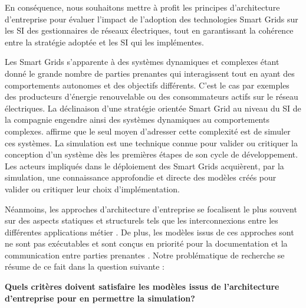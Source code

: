 En conséquence, nous souhaitons mettre à profit les principes d'architecture d'entreprise pour 
évaluer l'impact de l'adoption des technologies Smart Grids sur les SI des 
gestionnaires de réseaux électriques, tout en garantissant la cohérence entre la 
stratégie adoptée et les SI qui les implémentes. 




Les Smart Grids s'apparente à des systèmes  dynamiques et complexes 
\cite{monti_power_2010} étant donné le grande nombre de parties prenantes qui interagissent  tout en ayant des comportements autonomes et des objectifs différents. C'est le cas par exemples des producteurs d'énergie renouvelable ou des consommateurs actifs sur le réseau électriques. La déclinaison d'une stratégie orientée Smart Grid au niveau du 
SI de la compagnie engendre ainsi des systèmes dynamiques au comportements 
complexes. \cite{borshchev2004system} affirme que le seul moyen d'adresser cette 
complexité est de simuler ces systèmes. La simulation est une technique connue 
pour valider ou critiquer la conception d'un système dès les premières étapes de 
son cycle de développement. Les acteurs impliqués dans le déploiement des 
Smart Grids acquièrent, par la  simulation, une connaissance approfondie et 
directe des modèles créés pour valider ou critiquer leur choix d'implémentation.

Néanmoins, les approches d'architecture d'entreprise se focalisent le plus souvent sur 
des aspects statiques et structurels tels que les interconnexions entre les 
différentes applications métier \cite{buckl2008towards}. De plus, les modèles 
issus de ces approches sont ne sont pas exécutables et sont conçus en priorité pour la documentation et la communication entre parties prenantes \cite{kulkarni2013modelling}. Notre 
problématique de recherche se résume de ce fait dans la question suivante :

\textbf{Quels critères doivent satisfaire les modèles issus de l'architecture 
d'entreprise pour en permettre la simulation?}
     




